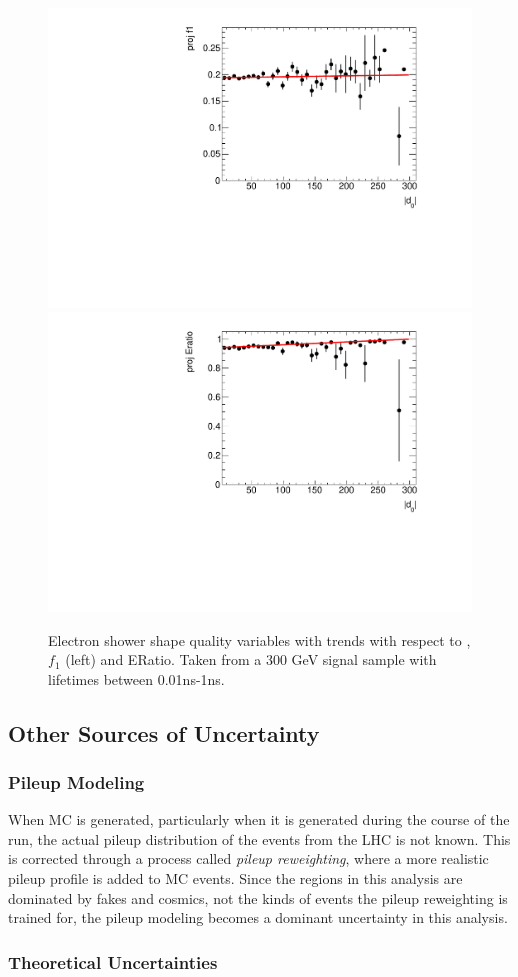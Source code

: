 \begin{figure}[htbp]
\centering
\includegraphics[width=.48\textwidth]{figures/disp_systs/e_signal_f1_profile.pdf}
\includegraphics[width=.48\textwidth]{figures/disp_systs/e_signal_Eratio_profile.pdf}
\caption{Electron shower shape quality variables with trends with respect to \absdz, $f_{1}$ (left) and ERatio. Taken from a 300 GeV signal sample with lifetimes between 0.01ns-1ns.}
\label{fig:profs_el}
\end{figure}


\subsection{Other Sources of Uncertainty}

\subsubsection{Pileup Modeling}
When \ac{MC} is generated, particularly when it is generated during the course of the run, the actual pileup distribution of the events from the \ac{LHC} is not known. This is corrected through a process called \emph{pileup reweighting}, where a more realistic pileup profile is added to \ac{MC} events. Since the regions in this analysis are dominated by fakes and cosmics, not the kinds of events the pileup reweighting is trained for, the pileup modeling becomes a dominant uncertainty in this analysis.

\subsubsection{Theoretical Uncertainties}

